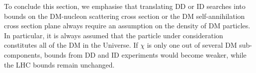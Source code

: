 To conclude this section, we emphasise that 
translating DD or ID searches into bounds on the DM-nucleon scattering  cross section  or the DM self-annihilation cross section plane always require an assumption on the density of DM particles. In particular, it is always assumed that the particle under consideration constitutes all of the DM in the Universe. If $\chi$ is only one out of several DM sub-components, bounds from  DD and ID experiments would become weaker, while  the LHC bounds  remain unchanged.

